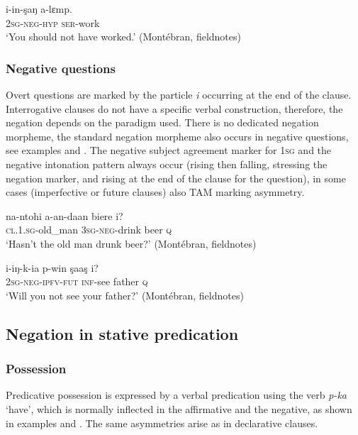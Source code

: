 \documentclass[output=paper,colorlinks,citecolor=brown]{langscibook}
\begin{document}
\ea\label{ex:mank:34}
    \gll  i-in-şaŋ a-lɛmp.\\
         \textsc{2sg{}-neg-hyp} \textsc{ser}-work\\
    \glt ‘You should not have worked.’ (Montébran, fieldnotes)
\z

\subsubsection{Negative questions}\label{sec:mank:2.2.4}

Overt questions are marked by the particle \textit{i} occurring at the end of the clause. Interrogative clauses do not have a specific verbal construction, therefore, the negation depends on the paradigm used. There is no dedicated negation morpheme, the standard negation morpheme also occurs in negative questions, see examples  and . The negative subject agreement marker for \textsc{1sg} and the negative intonation pattern always occur (rising then falling, stressing the negation marker, and rising at the end of the clause for the question), in some cases (imperfective or future clauses) also TAM marking asymmetry.

\ea\label{ex:mank:35}
    \gll na-ntohi a-an-daan biere i?\\
         \textsc{cl.1.sg}-old\_man \textsc{3sg-neg}-drink beer \textsc{q}\\
    \glt ‘Hasn't the old man drunk beer?’ (Montébran, fieldnotes)
\z

\ea\label{ex:mank:36}
    \gll i-iŋ-k-ia p-win şaaş i?\\
         \textsc{2sg-neg-ipfv-fut} \textsc{inf}-see father \textsc{q}\\
    \glt ‘Will you not see your father?’ (Montébran, fieldnotes)
\z

\subsection{Negation in stative predication}\label{sec:mank:2.3}
\subsubsection{Possession}\label{sec:mank:2.3.1}

Predicative possession is expressed by a verbal predication using the verb \textit{p-ka} ‘have’, which is normally inflected in the affirmative and the negative, as shown in examples  and . The same asymmetries arise as in declarative clauses.
\end{document}
